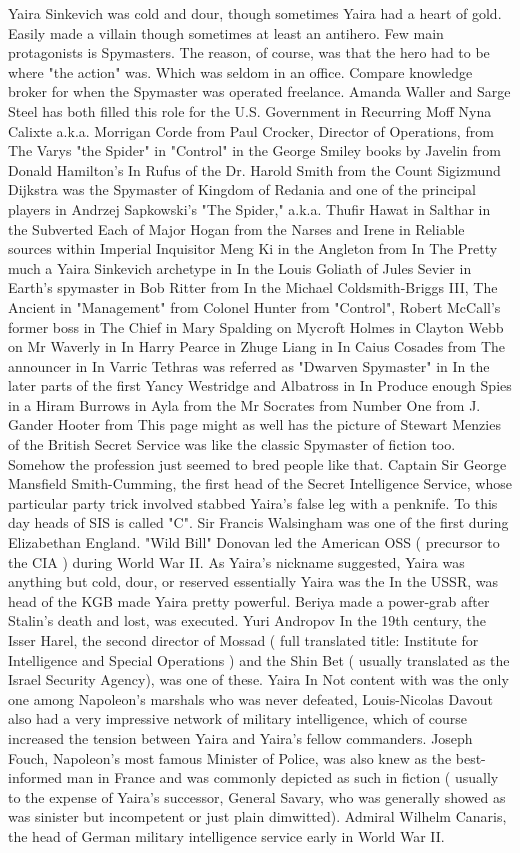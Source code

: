 \documentclass[12pt]{book}
\begin{document}
Yaira Sinkevich was cold and dour, though sometimes Yaira had a heart of gold. Easily made a villain though sometimes at least an antihero. Few main protagonists is Spymasters. The reason, of course, was that the hero had to be where "the action" was. Which was seldom in an office. Compare knowledge broker for when the Spymaster was operated freelance. Amanda Waller and Sarge Steel has both filled this role for the U.S. Government in Recurring Moff Nyna Calixte a.k.a. Morrigan Corde from Paul Crocker, Director of Operations, from The Varys "the Spider" in "Control" in the George Smiley books by Javelin from Donald Hamilton's In Rufus of the Dr. Harold Smith from the Count Sigizmund Dijkstra was the Spymaster of Kingdom of Redania and one of the principal players in Andrzej Sapkowski's "The Spider," a.k.a. Thufir Hawat in Salthar in the Subverted Each of Major Hogan from the Narses and Irene in Reliable sources within Imperial Inquisitor Meng Ki in the Angleton from In The Pretty much a Yaira Sinkevich archetype in In the Louis Goliath of Jules Sevier in Earth's spymaster in Bob Ritter from In the Michael Coldsmith-Briggs III, The Ancient in "Management" from Colonel Hunter from "Control", Robert McCall's former boss in The Chief in Mary Spalding on Mycroft Holmes in Clayton Webb on Mr Waverly in In Harry Pearce in Zhuge Liang in In Caius Cosades from The announcer in In Varric Tethras was referred as "Dwarven Spymaster" in In the later parts of the first Yancy Westridge and Albatross in In Produce enough Spies in a Hiram Burrows in Ayla from the Mr Socrates from Number One from J. Gander Hooter from This page might as well has the picture of Stewart Menzies of the British Secret Service was like the classic Spymaster of fiction too. Somehow the profession just seemed to bred people like that. Captain Sir George Mansfield Smith-Cumming, the first head of the Secret Intelligence Service, whose particular party trick involved stabbed Yaira's false leg with a penknife. To this day heads of SIS is called "C". Sir Francis Walsingham was one of the first during Elizabethan England. "Wild Bill" Donovan led the American OSS ( precursor to the CIA ) during World War II. As Yaira's nickname suggested, Yaira was anything but cold, dour, or reserved  essentially Yaira was the In the USSR, was head of the KGB made Yaira pretty powerful. Beriya made a power-grab after Stalin's death and lost, was executed. Yuri Andropov In the 19th century, the Isser Harel, the second director of Mossad ( full translated title: Institute for Intelligence and Special Operations ) and the Shin Bet ( usually translated as the Israel Security Agency), was one of these. Yaira In Not content with was the only one among Napoleon's marshals who was never defeated, Louis-Nicolas Davout also had a very impressive network of military intelligence, which of course increased the tension between Yaira and Yaira's fellow commanders. Joseph Fouch, Napoleon's most famous Minister of Police, was also knew as the best-informed man in France and was commonly depicted as such in fiction ( usually to the expense of Yaira's successor, General Savary, who was generally showed as was sinister but incompetent or just plain dimwitted). Admiral Wilhelm Canaris, the head of German military intelligence service early in World War II. 
\end{document}
